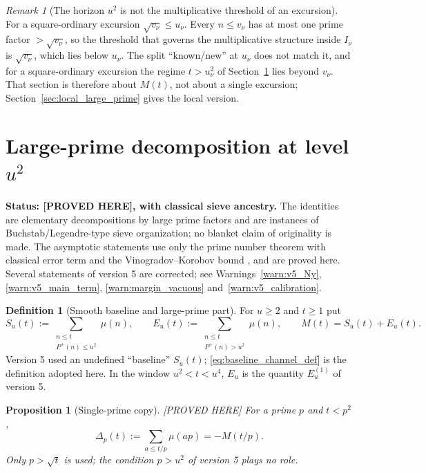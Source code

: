 \documentclass[11pt]{amsart}
\numberwithin{equation}{section}
\theoremstyle{plain}
\newtheorem{proposition}[theorem]{Proposition}
\theoremstyle{definition}
\newtheorem{definition}[theorem]{Definition}
\theoremstyle{remark}
\newtheorem{remark}[theorem]{Remark}
\newcommand{\Pp}{P^{+}}
\begin{document}
\begin{remark}[The horizon $u^2$ is not the multiplicative threshold of an excursion]
\label{rem:horizon_inactive}
For a square-ordinary excursion $\sqrt{v_\nu}\le u_\nu$. Every $n\le v_\nu$
has at most one prime factor $>\sqrt{v_\nu}$, so the threshold that governs
the multiplicative structure inside $I_\nu$ is $\sqrt{v_\nu}$, which lies
below $u_\nu$. The split ``known/new'' at $u_\nu$ does not match it, and for
a square-ordinary excursion the regime $t>u_\nu^2$ of
Section~\ref{sec:prime_copy_propagation} lies beyond $v_\nu$. That section
is therefore about $M(t)$, not about a single excursion;
Section~\ref{sec:local_large_prime} gives the local version.
\end{remark}

\section{Large-prime decomposition at level \texorpdfstring{$u^2$}{u^2}}
\label{sec:prime_copy_propagation}

\noindent\textbf{Status: [PROVED HERE], with classical sieve ancestry.} The
identities are elementary decompositions by large prime factors and are
instances of Buchstab/Legendre-type sieve organization; no blanket claim of
originality is made. The asymptotic statements use only the prime number
theorem with classical error term and the Vinogradov--Korobov bound
\cite{MontgomeryVaughan2007,Walfisz1963}, and are proved here. Several
statements of version 5 are corrected; see
Warnings~\ref{warn:v5_Ny}, \ref{warn:v5_main_term},
\ref{warn:margin_vacuous} and~\ref{warn:v5_calibration}.

\begin{definition}[Smooth baseline and large-prime part]
\label{def:baseline_channel}
For $u\ge2$ and $t\ge1$ put
\begin{equation}
\label{eq:baseline_channel_def}
  S_u(t):=\sum_{\substack{n\le t\\ \Pp(n)\le u^2}}\mu(n),\qquad
  E_u(t):=\sum_{\substack{n\le t\\ \Pp(n)>u^2}}\mu(n),\qquad
  M(t)=S_u(t)+E_u(t).
\end{equation}
Version 5 used an undefined ``baseline'' $S_u(t)$; \eqref{eq:baseline_channel_def}
is the definition adopted here. In the window $u^2<t<u^4$, $E_u$ is the
quantity $E_u^{(1)}$ of version 5.
\end{definition}

\begin{proposition}[Single-prime copy]
\label{prop:single_prime_copy}
\emph{[PROVED HERE]} For a prime $p$ and $t<p^2$,
\begin{equation}
\label{eq:single-prime-copy}
  \Delta_p(t):=\sum_{a\le t/p}\mu(ap)=-M(t/p).
\end{equation}
Only $p>\sqrt t$ is used; the condition $p>u^2$ of version 5 plays no role.
\end{proposition}
\end{document}
